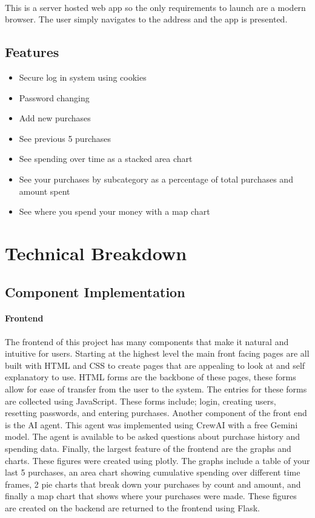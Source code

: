 \documentclass{article}
\begin{document}
			\paragraph{} This is a server hosted web app so the only requirements to launch are a modern browser. The user simply navigates to the address and the app is presented.
		
		\subsection*{Features}
		
			\begin{itemize}
				\item Secure log in system using cookies
				\item Password changing
				\item Add new purchases
				\item See previous 5 purchases
				\item See spending over time as a stacked area chart
				\item See your purchases by subcategory as a percentage of total purchases and amount spent
				\item See where you spend your money with a map chart
			\end{itemize}
	
	\section*{Technical Breakdown}
	
		\subsection*{Component Implementation}
		
			\paragraph{Frontend} The frontend of this project has many components that make it natural and intuitive for users. Starting at the highest level the main front facing pages are all built with HTML and CSS to create pages that are appealing to look at and self explanatory to use. HTML forms are the backbone of these pages, these forms allow for ease of transfer from the user to the system. The entries for these forms are collected using JavaScript. These forms include; login, creating users, resetting passwords, and entering purchases. Another component of the front end is the AI agent. This agent was implemented using CrewAI with a free Gemini model. The agent is available to be asked questions about purchase history and spending data. Finally, the largest feature of the frontend are the graphs and charts. These figures were created using plotly. The graphs include a table of your last 5 purchases, an area chart showing cumulative spending over different time frames, 2 pie charts that break down your purchases by count and amount, and finally a map chart that shows where your purchases were made. These figures are created on the backend are returned to the frontend using Flask.
			
\end{document}
